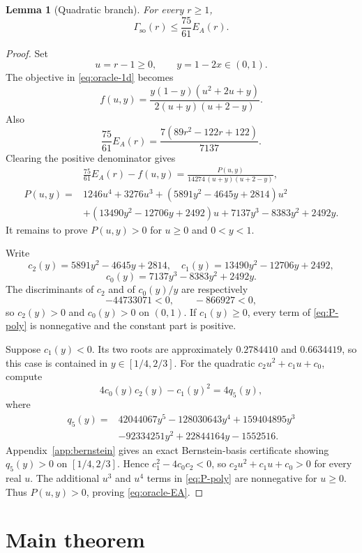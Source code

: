 \documentclass[11pt]{article}
\newtheorem{lemma}[theorem]{Lemma}
\theoremstyle{definition}
\theoremstyle{remark}
\newcommand{\so}{\mathrm{so}}
\begin{document}
\begin{lemma}[Quadratic branch]
For every $r\ge1$,
\begin{equation}
\Gamma_{\so}(r)\le \frac{75}{61}E_A(r).
\label{eq:oracle-EA}
\end{equation}
\end{lemma}
\begin{proof}
Set
\[
u=r-1\ge0,
\qquad
y=1-2x\in(0,1).
\]
The objective in \eqref{eq:oracle-1d} becomes
\[
f(u,y)
=
\frac{y(1-y)(u^2+2u+y)}{2(u+y)(u+2-y)}.
\]
Also
\[
\frac{75}{61}E_A(r)
=
\frac{7(89r^2-122r+122)}{7137}.
\]
Clearing the positive denominator gives
\begin{align}
&\frac{75}{61}E_A(r)-f(u,y)
=
\frac{P(u,y)}{14274\,(u+y)(u+2-y)},
\label{eq:P-difference}\\[1mm]
P(u,y)
={}&1246u^4+3276u^3
+(5891y^2-4645y+2814)u^2\nonumber\\
&+(13490y^2-12706y+2492)u
+7137y^3-8383y^2+2492y.
\label{eq:P-poly}
\end{align}
It remains to prove $P(u,y)>0$ for $u\ge0$ and $0<y<1$.

Write
\[
c_2(y)=5891y^2-4645y+2814,
\quad
c_1(y)=13490y^2-12706y+2492,
\]
\[
c_0(y)=7137y^3-8383y^2+2492y.
\]
The discriminants of $c_2$ and of $c_0(y)/y$ are respectively
\[
-44733071<0,
\qquad
-866927<0,
\]
so $c_2(y)>0$ and $c_0(y)>0$ on $(0,1)$. If $c_1(y)\ge0$, every term of \eqref{eq:P-poly} is nonnegative and the constant part is positive.

Suppose $c_1(y)<0$. Its two roots are approximately $0.2784410$ and $0.6634419$, so this case is contained in $y\in[1/4,2/3]$. For the quadratic $c_2u^2+c_1u+c_0$, compute
\begin{equation}
4c_0(y)c_2(y)-c_1(y)^2=4q_5(y),
\label{eq:q5disc}
\end{equation}
where
\begin{align}
q_5(y)={}&42044067y^5-128030643y^4+159404895y^3\\
&-92334251y^2+22844164y-1552516.
\label{eq:q5}
\end{align}
Appendix~\ref{app:bernstein} gives an exact Bernstein-basis certificate showing $q_5(y)>0$ on $[1/4,2/3]$. Hence $c_1^2-4c_0c_2<0$, so $c_2u^2+c_1u+c_0>0$ for every real $u$. The additional $u^3$ and $u^4$ terms in \eqref{eq:P-poly} are nonnegative for $u\ge0$. Thus $P(u,y)>0$, proving \eqref{eq:oracle-EA}.
\end{proof}

\section{Main theorem}
\end{document}

